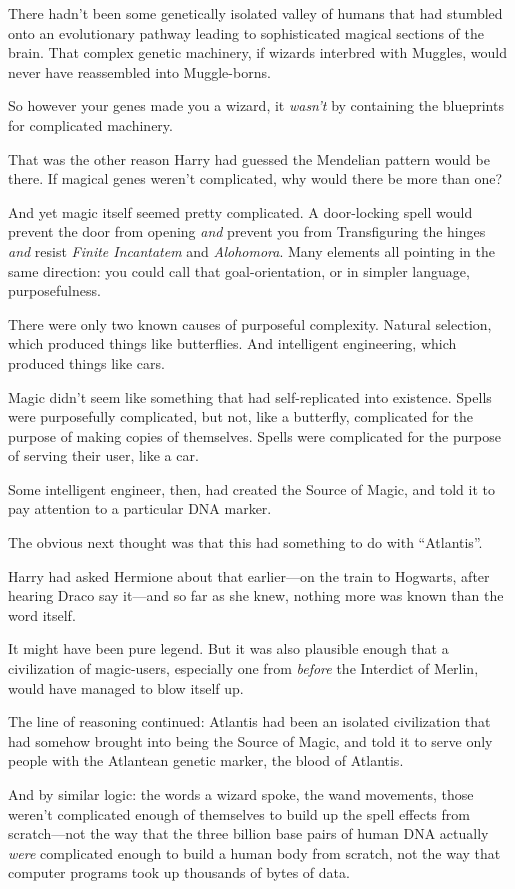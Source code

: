 There hadn’t been some genetically isolated valley of humans that had stumbled onto an evolutionary pathway leading to sophisticated magical sections of the brain. That complex genetic machinery, if wizards interbred with Muggles, would never have reassembled into Muggle-borns.

So however your genes made you a wizard, it \emph{wasn’t} by containing the blueprints for complicated machinery.

That was the other reason Harry had guessed the Mendelian pattern would be there. If magical genes weren’t complicated, why would there be more than one?

And yet magic itself seemed pretty complicated. A door-locking spell would prevent the door from opening \emph{and} prevent you from Transfiguring the hinges \emph{and} resist \emph{Finite Incantatem} and \emph{Alohomora}. Many elements all pointing in the same direction: you could call that goal-orientation, or in simpler language, purposefulness.

There were only two known causes of purposeful complexity. Natural selection, which produced things like butterflies. And intelligent engineering, which produced things like cars.

Magic didn’t seem like something that had self-replicated into existence. Spells were purposefully complicated, but not, like a butterfly, complicated for the purpose of making copies of themselves. Spells were complicated for the purpose of serving their user, like a car.

Some intelligent engineer, then, had created the Source of Magic, and told it to pay attention to a particular DNA marker.

The obvious next thought was that this had something to do with “Atlantis”.

Harry had asked Hermione about that earlier—on the train to Hogwarts, after hearing Draco say it—and so far as she knew, nothing more was known than the word itself.

It might have been pure legend. But it was also plausible enough that a civilization of magic-users, especially one from \emph{before} the Interdict of Merlin, would have managed to blow itself up.

The line of reasoning continued: Atlantis had been an isolated civilization that had somehow brought into being the Source of Magic, and told it to serve only people with the Atlantean genetic marker, the blood of Atlantis.

And by similar logic: the words a wizard spoke, the wand movements, those weren’t complicated enough of themselves to build up the spell effects from scratch—not the way that the three billion base pairs of human DNA actually \emph{were} complicated enough to build a human body from scratch, not the way that computer programs took up thousands of bytes of data.

